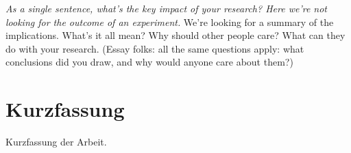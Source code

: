 \emph{As a single sentence, what’s the key impact of your research?
  Here we’re not looking for the outcome of an experiment.
}
We’re looking for a summary of the implications.
What’s it all mean?
Why should other people care?
What can they do with your research.
(Essay folks: all the same questions apply: what conclusions did you draw, and why would anyone care about them?)


\section*{Kurzfassung}
\begin{otherlanguage}{ngerman}
  Kurzfassung der Arbeit.
\end{otherlanguage}



%
%
\tableofcontents

\listoffigures

\listoftables
\listoflistings


\printglossary[type=\acronymtype,title={Abbreviations}]


\renewcommand*{\chapterpagestyle}{scrplain}
\pagestyle{scrheadings}
\mainmatter

